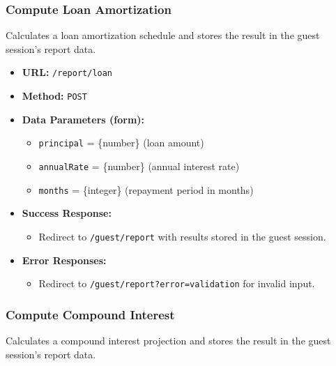 \subsubsection{Compute Loan Amortization}

Calculates a loan amortization schedule and stores the result in the guest session's report data.

\begin{itemize}
    \item \textbf{URL:} \texttt{/report/loan}
    \item \textbf{Method:} \texttt{POST}
    \item \textbf{Data Parameters (form):}
    \begin{itemize}
        \item \texttt{principal} = \{number\} (loan amount)
        \item \texttt{annualRate} = \{number\} (annual interest rate)
        \item \texttt{months} = \{integer\} (repayment period in months)
    \end{itemize}
    \item \textbf{Success Response:}
    \begin{itemize}
        \item Redirect to \texttt{/guest/report} with results stored in the guest session.
    \end{itemize}
    \item \textbf{Error Responses:}
    \begin{itemize}
        \item Redirect to \texttt{/guest/report?error=validation} for invalid input.
    \end{itemize}
\end{itemize}

\subsubsection{Compute Compound Interest}

Calculates a compound interest projection and stores the result in the guest session's report data.

